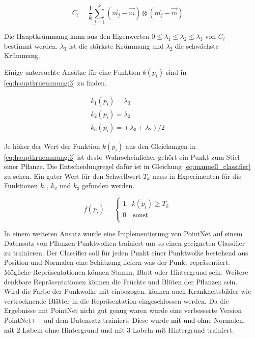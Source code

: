 \documentclass[12pt,titlepage, twoside]{article}
\begin{document}
\begin{equation}
\label{eq:hauptkruemmung:2}
C_i = \frac{1}{k} \sum_{j=1}^k{(\vec{m}_j - \vec{\bar{m}}) \otimes (\vec{m}_j - \vec{\bar{m}})}
\end{equation}

Die Hauptkrümmung kann aus den Eigenwerten $0 \leq \lambda_1 \leq \lambda_2 \leq \lambda_3$ von $C_i$ bestimmt werden. $\lambda_3$ ist die stärkste Krümmung und $\lambda_2$ die schwächste Krümmung.

Einige untersuchte Ansätze für eine Funktion $k(p_i)$ sind in \ref{eq:hauptkruemmung:3} zu finden. 

\begin{equation}
\label{eq:hauptkruemmung:3}
\begin{array}{ll}
k_1(p_i) = \lambda_3 \\
k_2(p_i) = \lambda_2 \\
k_3(p_i) = (\lambda_3 + \lambda_2) / 2 
\end{array}{}
\end{equation}

Je höher der Wert der Funktion $k(p_i)$ aus den Gleichungen in \ref{eq:hauptkruemmung:3} ist desto Wahrscheinlicher gehört ein Punkt zum Stiel einer Pflanze. Die Entscheidungregel dafür ist in Gleichung \ref{eq:manuell_classifier} zu sehen.
Ein guter Wert für den Schwellwert $T_k$ muss in Experimenten für die Funktionen $k_1$, $k_2$ und $k_3$ gefunden werden.

\begin{equation}
\label{eq:manuell_classifier}
f(p_i) = \left\{
\begin{array}{ll}
1 & k(p_i) \geq T_k \\
0 & \, \textrm{sonst} \\
\end{array}
\right. 
\end{equation}

In einem weiteren Ansatz wurde eine Implementierung von PointNet auf einem Datensatz von Pflanzen-Punktwolken trainiert um so einen geeigneten Classifier zu trainieren.
Der Classifier soll für jeden Punkt einer Punktwolke bestehend aus Position und Normalen eine Schätzung liefern was der Punkt repräsentiert. Mögliche Repräsentationen können Stamm, Blatt oder Hintergrund sein.
Weitere denkbare Repräsentationen können die Früchte und Blüten der Pflanzen sein. Wird die Farbe der Punkwolke mit einbezogen, können auch Krankheitsbilder wie vertrocknende Blätter in die Repräsentation eingeschlossen werden.  
Da die Ergebnisse mit PointNet nicht gut genug waren wurde eine verbesserte Version PointNet++ auf dem Datensatz trainiert. Diese wurde mit und ohne Normalen, mit 2 Labeln ohne Hintergrund und mit 3 Labeln mit Hintergrund trainiert.
\end{document}
